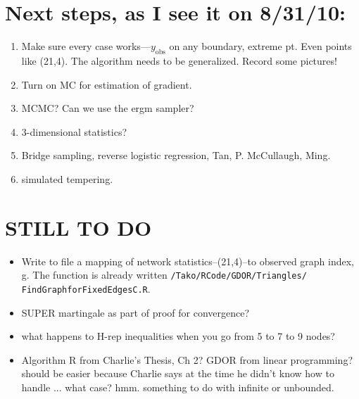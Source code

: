 \documentclass{amsbook}
\newcommand{\yobs}{y_{\textrm{obs}}}
\theoremstyle{definition}
\theoremstyle{remark}
\begin{document}
\section{Next steps, as I see it on 8/31/10:}
\begin{enumerate}
\item Make sure every case works---$\yobs$ on any boundary, extreme pt.  Even points 
like (21,4).  The algorithm needs to be generalized.  Record some pictures!
\item Turn on MC for estimation of gradient.  
\item MCMC?  Can we use the ergm sampler?
\item 3-dimensional statistics?
\item Bridge sampling, reverse logistic regression, Tan, P. McCullaugh, Ming.
\item simulated tempering.
\end{enumerate}

\section{STILL TO DO}

\begin{itemize}
\item Write to file a mapping of network statistics--(21,4)--to observed graph index, 
g.  The function is already written \texttt{/Tako/RCode/GDOR/Triangles/
FindGraphforFixedEdgesC.R}.
\item SUPER martingale as part of proof for convergence?
\item what happens to H-rep inequalities when you go from 5 to 7 to 9 nodes?
\item Algorithm R from Charlie's Thesis, Ch 2?  GDOR from linear programming?  should 
be easier because Charlie says at the time he didn't know how to handle ... what case?  
hmm.  something to do with infinite or unbounded.
\end{itemize}





\end{document}
